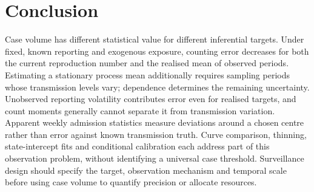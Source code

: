 \section{Conclusion}
\label{sec:conclusion}

Case volume has different statistical value for different inferential targets. Under fixed, known reporting and exogenous exposure, counting error decreases for both the current reproduction number and the realised mean of observed periods. Estimating a stationary process mean additionally requires sampling periods whose transmission levels vary; dependence determines the remaining uncertainty. Unobserved reporting volatility contributes error even for realised targets, and count moments generally cannot separate it from transmission variation. Apparent weekly admission statistics measure deviations around a chosen centre rather than error against known transmission truth. Curve comparison, thinning, state-intercept fits and conditional calibration each address part of this observation problem, without identifying a universal case threshold. Surveillance design should specify the target, observation mechanism and temporal scale before using case volume to quantify precision or allocate resources.
